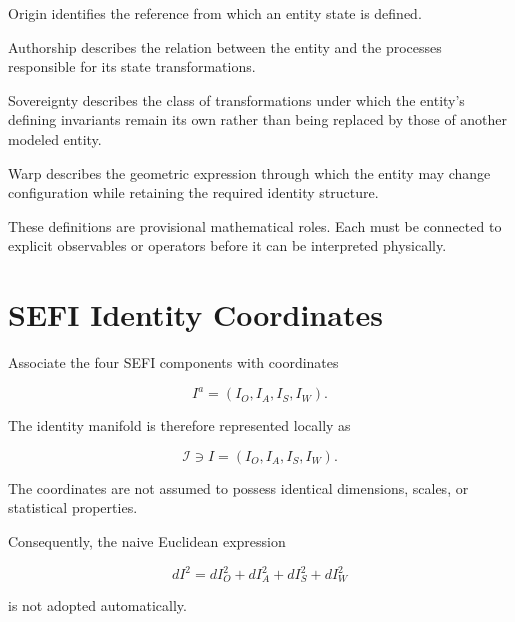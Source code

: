 \documentclass[12pt,oneside]{book}
\begin{document}
Origin identifies the reference from which an entity state is
defined.

Authorship describes the relation between the entity and the
processes responsible for its state transformations.

Sovereignty describes the class of transformations under which
the entity's defining invariants remain its own rather than
being replaced by those of another modeled entity.

Warp describes the geometric expression through which the
entity may change configuration while retaining the required
identity structure.

These definitions are provisional mathematical roles. Each must
be connected to explicit observables or operators before it can
be interpreted physically.


\section{SEFI Identity Coordinates}
\label{sec:sefi-identity-coordinates}

Associate the four SEFI components with coordinates

\begin{equation}
    I^a
    =
    \left(
        I_O,
        I_A,
        I_S,
        I_W
    \right).
    \label{eq:sefi-coordinate-vector}
\end{equation}

The identity manifold is therefore represented locally as

\begin{equation}
    \mathcal{I}
    \ni
    I
    =
    \left(
        I_O,
        I_A,
        I_S,
        I_W
    \right).
    \label{eq:sefi-identity-point}
\end{equation}

The coordinates are not assumed to possess identical dimensions,
scales, or statistical properties.

Consequently, the naive Euclidean expression

\begin{equation}
    dI^2
    =
    dI_O^2
    +
    dI_A^2
    +
    dI_S^2
    +
    dI_W^2
\end{equation}

is not adopted automatically.
\end{document}

